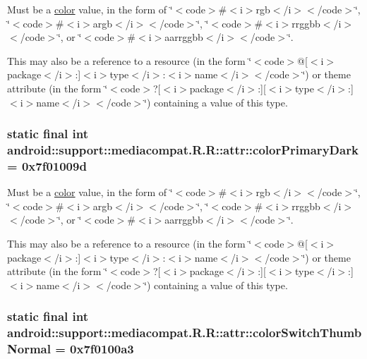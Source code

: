 Must be a \hyperlink{classandroid_1_1support_1_1mediacompat_1_1_r_1_1color}{color} value, in the form of \char`\"{}$<$code$>$\#$<$i$>$rgb$<$/i$>$$<$/code$>$\char`\"{}, \char`\"{}$<$code$>$\#$<$i$>$argb$<$/i$>$$<$/code$>$\char`\"{}, \char`\"{}$<$code$>$\#$<$i$>$rrggbb$<$/i$>$$<$/code$>$\char`\"{}, or \char`\"{}$<$code$>$\#$<$i$>$aarrggbb$<$/i$>$$<$/code$>$\char`\"{}. 

This may also be a reference to a resource (in the form \char`\"{}$<$code$>$@\mbox{[}$<$i$>$package$<$/i$>$:\mbox{]}$<$i$>$type$<$/i$>$:$<$i$>$name$<$/i$>$$<$/code$>$\char`\"{}) or theme attribute (in the form \char`\"{}$<$code$>$?\mbox{[}$<$i$>$package$<$/i$>$:\mbox{]}\mbox{[}$<$i$>$type$<$/i$>$:\mbox{]}$<$i$>$name$<$/i$>$$<$/code$>$\char`\"{}) containing a value of this type. \hypertarget{classandroid_1_1support_1_1mediacompat_1_1_r_1_1attr_f469ec435c94457bf783e4c3e438bc0d}{
\subsubsection[{colorPrimaryDark}]{\setlength{\rightskip}{0pt plus 5cm}static final int android::support::mediacompat.R.R::attr::colorPrimaryDark = 0x7f01009d}}
\label{classandroid_1_1support_1_1mediacompat_1_1_r_1_1attr_f469ec435c94457bf783e4c3e438bc0d}


Must be a \hyperlink{classandroid_1_1support_1_1mediacompat_1_1_r_1_1color}{color} value, in the form of \char`\"{}$<$code$>$\#$<$i$>$rgb$<$/i$>$$<$/code$>$\char`\"{}, \char`\"{}$<$code$>$\#$<$i$>$argb$<$/i$>$$<$/code$>$\char`\"{}, \char`\"{}$<$code$>$\#$<$i$>$rrggbb$<$/i$>$$<$/code$>$\char`\"{}, or \char`\"{}$<$code$>$\#$<$i$>$aarrggbb$<$/i$>$$<$/code$>$\char`\"{}. 

This may also be a reference to a resource (in the form \char`\"{}$<$code$>$@\mbox{[}$<$i$>$package$<$/i$>$:\mbox{]}$<$i$>$type$<$/i$>$:$<$i$>$name$<$/i$>$$<$/code$>$\char`\"{}) or theme attribute (in the form \char`\"{}$<$code$>$?\mbox{[}$<$i$>$package$<$/i$>$:\mbox{]}\mbox{[}$<$i$>$type$<$/i$>$:\mbox{]}$<$i$>$name$<$/i$>$$<$/code$>$\char`\"{}) containing a value of this type. \hypertarget{classandroid_1_1support_1_1mediacompat_1_1_r_1_1attr_dc6997fb454c78fc8bd3daf5b08f38d9}{
\subsubsection[{colorSwitchThumbNormal}]{\setlength{\rightskip}{0pt plus 5cm}static final int android::support::mediacompat.R.R::attr::colorSwitchThumbNormal = 0x7f0100a3}}
\label{classandroid_1_1support_1_1mediacompat_1_1_r_1_1attr_dc6997fb454c78fc8bd3daf5b08f38d9}


